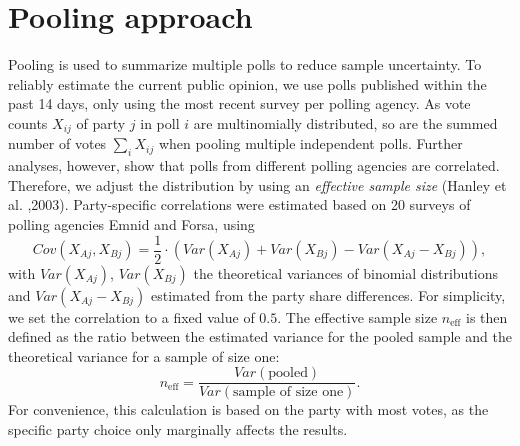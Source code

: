 \documentclass[twoside]{report}
\begin{document}
\section{Pooling approach}
Pooling is used to summarize multiple polls to reduce sample uncertainty.
To reliably estimate the current public opinion, we use polls published within the past 14 days, only using the most recent survey per polling agency.
As vote counts $X_{ij}$ of party $j$ in poll $i$ are multinomially distributed, so are the summed number of votes $\sum_i X_{ij}$ when pooling multiple independent polls.
Further analyses, however, show that polls from different
polling agencies are correlated.
Therefore, we adjust the
distribution by using an \textit{effective sample size} (Hanley et al. ,2003).
Party-specific correlations were estimated based on
20 surveys of polling agencies Emnid and Forsa, using
$$
Cov(X_{Aj}, X_{Bj}) = \frac{1}{2} \cdot \left(Var(X_{Aj}) + Var(X_{Bj}) - Var(X_{Aj} - X_{Bj}) \right),
$$
with $Var(X_{Aj})$, $Var(X_{Bj})$ the theoretical variances of binomial distributions and $Var(X_{Aj} - X_{Bj})$ estimated from the party share differences.
For simplicity, we set the correlation to a fixed value of $0.5$.
The effective sample size $n_{\text{eff}}$ is then defined as the ratio between
the estimated variance for the pooled sample and the theoretical variance for a
sample of size one:
$$
n_{\text{eff}} = \frac{Var(\text{pooled})}{Var(\text{sample of size one})}.
$$
For convenience, this calculation is based on the party with most votes,
as the specific party choice only marginally affects the results.
\end{document}
